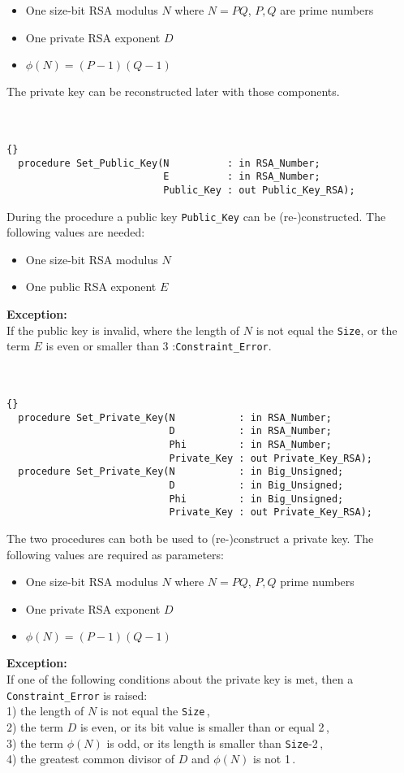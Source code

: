 \begin{itemize}
\item One size-bit RSA modulus $N$ where $N=PQ$, $P,Q$ are prime numbers
\item One private RSA exponent $D$
\item $\phi(N)=(P-1)(Q-1)$
\end{itemize}
The private key can be reconstructed later with those components.\\
\hline \\ \ \\
\begin{lstlisting}{}
  procedure Set_Public_Key(N          : in RSA_Number;
                           E          : in RSA_Number;
                           Public_Key : out Public_Key_RSA);
\end{lstlisting}
During the procedure a public key \texttt{Public\_Key} can be (re-)constructed. The following values are needed:
\begin{itemize}
\item One size-bit RSA modulus $N$
\item One public RSA exponent $E$
\end{itemize}
\textbf{Exception:}\\
If the public key is invalid, where the length of $N$ is not equal the \texttt{Size}, or the term $E$ is even or smaller than 3 :\quad \texttt{Constraint\_Error}.\\
\hline \\ \ \\
\begin{lstlisting}{}
  procedure Set_Private_Key(N           : in RSA_Number;
                            D           : in RSA_Number;
                            Phi         : in RSA_Number;
                            Private_Key : out Private_Key_RSA);
  procedure Set_Private_Key(N           : in Big_Unsigned;
                            D           : in Big_Unsigned;
                            Phi         : in Big_Unsigned;
                            Private_Key : out Private_Key_RSA);
\end{lstlisting}
The two procedures can both be used to (re-)construct a private key. The following values are required as parameters:
\begin{itemize}
\item One size-bit RSA modulus $N$ where $N=PQ$, $P,Q$ prime numbers
\item One private RSA exponent $D$
\item $\phi(N)=(P-1)(Q-1)$
\end{itemize}
\textbf{Exception:}\\ If one of the following conditions about the private key is met, then a \texttt{Constraint\_Error} is raised:\\
1) the length of $N$ is not equal the \texttt{Size}\,,\\
2) the term $D$ is even, or its bit value is smaller than or equal 2\,, \\
3) the term $\phi(N)$ is odd, or its length is smaller than \texttt{Size}-2\,,\\
4) the greatest common divisor of $D$ and $\phi(N)$ is not 1\,.
